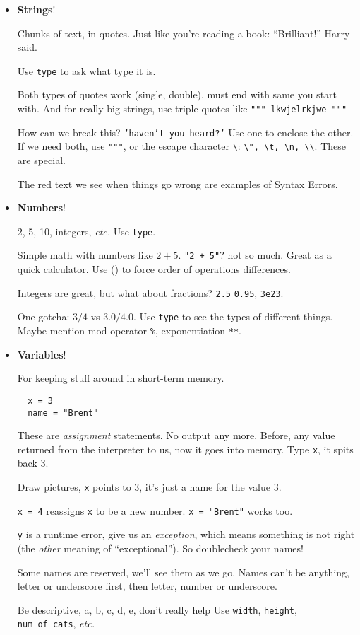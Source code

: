 \documentclass{article}
\newcommand{\etc}{\emph{etc.}\xspace}
\begin{document}
\begin{itemize}
\item \textbf{Strings}!

  Chunks of text, in quotes. Just like you're reading a book:
  ``Brilliant!'' Harry said.

  Use \texttt{type} to ask what type it is.

  Both types of quotes work (single, double), must end with same you
  start with. And for really big strings, use triple quotes like
  \texttt{""" lkwjelrkjwe """}

  How can we break this? \texttt{'haven't you heard?'}  Use one to
  enclose the other.  If we need both, use \texttt{"""}, or the escape
  character \texttt{\textbackslash}: \texttt{\textbackslash ", \textbackslash t,
    \textbackslash n, \textbackslash\textbackslash}. These are special.

  The red text we see when things go wrong are examples of Syntax
  Errors.

\item \textbf{Numbers}!

  2, 5, 10, integers, \etc  Use \texttt{type}.

  Simple math with numbers like $2+5$. \texttt{"2 + 5"}? not so much.
  Great as a quick calculator. Use () to force order of operations
  differences.

  Integers are great, but what about fractions? \texttt{2.5}
  \texttt{0.95}, \texttt{3e23}.

  One gotcha: $3 / 4$ vs $3.0 / 4.0$.  Use \verb|type| to see the
  types of different things.  Maybe mention mod operator \verb|%|,
  exponentiation \verb|**|.

\item \textbf{Variables}!

  For keeping stuff around in short-term memory.
  \begin{verbatim}
  x = 3
  name = "Brent"
  \end{verbatim}
  These are \emph{assignment} statements.  No output any more. Before,
  any value returned from the interpreter to us, now it goes into
  memory.  Type \texttt{x}, it spits back 3.

  Draw pictures, \texttt{x} points to $3$, it's just a name for the
  value $3$.

  \texttt{x = 4} reassigns \texttt{x} to be a new number.  \texttt{x =
    "Brent"} works too.

  \texttt{y} is a runtime error, give us an \emph{exception}, which
  means something is not right (the \emph{other} meaning of
  ``exceptional''). So doublecheck your names!

  Some names are reserved, we'll see them as we go.
  Names can't be anything, letter or underscore first, then letter,
  number or underscore.

  Be descriptive, a, b, c, d, e, don't really help
  Use \texttt{width}, \texttt{height}, \texttt{num\_of\_cats}, \etc
\end{itemize}
\end{document}
